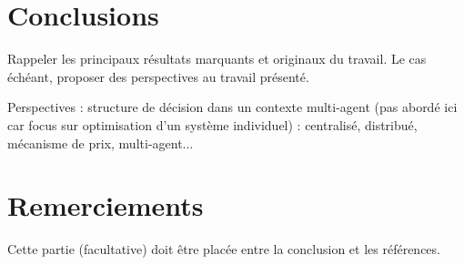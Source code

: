 \documentclass[a4paper,10pt,twocolumn]{article}
\begin{document}
\section{Conclusions}

Rappeler les principaux résultats marquants et originaux du travail. Le cas échéant, proposer des perspectives au travail présenté.

Perspectives : structure de décision dans un contexte multi-agent (pas abordé ici
car focus sur optimisation d'un système individuel) : centralisé, distribué,
mécanisme de prix, multi-agent...


\section{Remerciements}

Cette partie (facultative) doit être placée entre la conclusion et les références.




\end{document}

